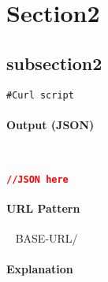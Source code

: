 \documentclass[
10pt, %
letterpaper, %
oneside, %
headinclude,footinclude, %
BCOR5mm, %
]{scrartcl}
\begin{document}

\section{Section2}


\subsection{subsection2}
\begin{lstlisting}
#Curl script 
\end{lstlisting}

\paragraph{Output (JSON)}~
\begin{lstlisting}[language=json]
//JSON here
\end{lstlisting}


\paragraph{URL Pattern} 
~\newline
BASE-URL/

\paragraph{Explanation}
\end{document}
